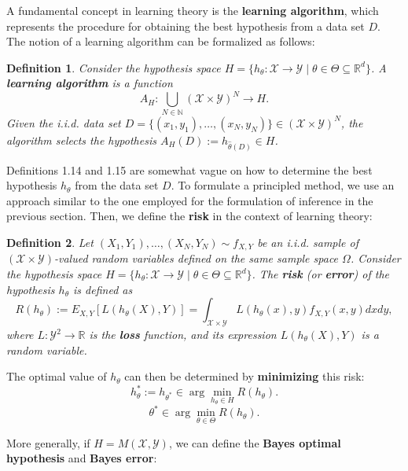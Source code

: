 \documentclass{report}
\newtheorem{definition}{Definition}[chapter]
\begin{document}
A fundamental concept in learning theory is the \textbf{learning algorithm}, which represents the procedure for obtaining the best hypothesis from a data set $D$. The notion of a learning algorithm can be formalized as follows:

\begin{definition}
Consider the hypothesis space $H = \{h_\theta : \mathcal{X} \to \mathcal{Y} \mid\theta\in\Theta\subseteq\mathbb{R}^d\}$. A \textbf{learning algorithm} is a function
\[ A_H : \bigcup_{N \in \mathbb{N}} (\mathcal{X}\times \mathcal{Y}) ^N\to H.\]
Given the  i.i.d. data set $D = \{(x_1,y_1), \dots, (x_N,y_N)\} \in (\mathcal{X} \times \mathcal{Y})^N$, the algorithm selects the hypothesis $A_H(D) := h_{\hat{\theta}(D)} \in H$.
\end{definition}

Definitions 1.14 and 1.15 are somewhat vague on how to determine the best hypothesis $h_\theta$ from the data set $D$. To formulate a principled method, we use an approach similar to the one employed for the formulation of inference in the previous section. Then, we define the \textbf{risk} in the context of learning theory:

\begin{definition}
Let $(X_1, Y_1),\dots,(X_N, Y_N) \sim f_{X,Y}$ be an i.i.d. sample of $(\mathcal{X} \times \mathcal{Y})$-valued random variables defined on the same sample space $\Omega$. Consider the hypothesis space $H = \{h_\theta : \mathcal{X} \to \mathcal{Y} \mid\theta\in\Theta\subseteq\mathbb{R}^d\}$. The \textbf{risk} (or \textbf{error}) of the hypothesis $h_\theta$ is defined as
\begin{equation}
R(h_\theta) := E_{X,Y}[L(h_\theta(X),Y)] = \int_{\mathcal{X} \times \mathcal{Y}} L(h_\theta(x),y)f_{X,Y}(x,y)dxdy,
\end{equation}
where $L :\mathcal{Y}^2 \to \mathbb{R}$ is the \textbf{loss} function, and its expression $L(h_\theta(X), Y)$ is a random variable.
\end{definition}

The optimal value of $h_\theta$ can then be determined by \textbf{minimizing} this risk:
\begin{equation}
h_\theta^* := h_{\theta^*} \in \arg \min_{h_\theta \in H} R(h_\theta).
\end{equation}
\begin{equation}
\theta^* \in \arg \min_{\theta \in \Theta} R(h_\theta).
\end{equation}

More generally, if $H = M(\mathcal{X}, \mathcal{Y})$, we can define the \textbf{Bayes optimal hypothesis} and \textbf{Bayes error}:
\end{document}
